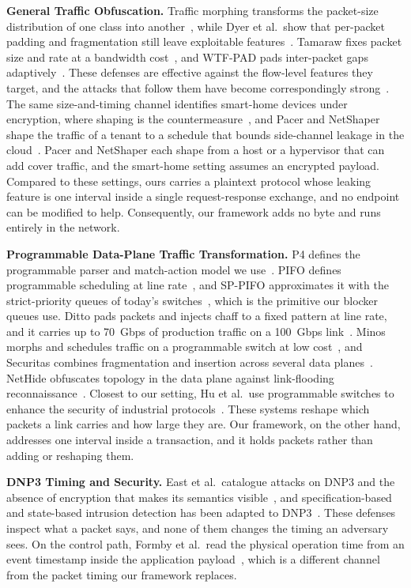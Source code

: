 \textbf{General Traffic Obfuscation.} Traffic morphing transforms the packet-size distribution of one
class into another~\cite{wright2009}, while Dyer et al.\ show that per-packet
padding and fragmentation still leave exploitable features~\cite{dyer2012}. Tamaraw
fixes packet size and rate at a bandwidth cost~\cite{tamaraw2014}, and
WTF-PAD pads inter-packet gaps adaptively~\cite{juarez2016}. These
defenses are effective against the flow-level features they target, and the attacks that follow them
have become correspondingly
strong~\cite{sirinam2018, panchenko2016}.
The same size-and-timing channel identifies smart-home devices under encryption, where shaping is the
countermeasure~\cite{apthorpe2019}, and Pacer and NetShaper shape the traffic of a
tenant to a schedule that bounds side-channel leakage in the
cloud~\cite{pacer2022, netshaper2024}. Pacer and
NetShaper each shape from a host or a hypervisor that can add cover traffic, and the smart-home
setting assumes an encrypted payload. Compared to these settings, ours carries a plaintext protocol
whose leaking feature is one interval inside a single request-response exchange, and no endpoint can
be modified to help. Consequently, our framework adds no byte and runs entirely in the network.

\textbf{Programmable Data-Plane Traffic Transformation.} P4 defines the programmable parser and
match-action model we use~\cite{p4ccr2014}. PIFO defines
programmable scheduling at line rate~\cite{pifo2016}, and SP-PIFO
approximates it with the strict-priority queues of today's
switches~\cite{sppifo2020}, which is the primitive our blocker queues use.
Ditto pads packets and injects chaff to a fixed pattern at line rate,
and it carries up to 70~Gbps of production traffic on a 100~Gbps
link~\cite{ditto2022}. Minos morphs and schedules traffic on a programmable switch at
low cost~\cite{minos2025}, and Securitas combines fragmentation and insertion
across several data planes~\cite{securitas2026}. NetHide obfuscates topology in
the data plane against link-flooding reconnaissance~\cite{nethide2018}. Closest
to our setting, Hu et al.\ use programmable switches to enhance the security of industrial
protocols~\cite{hulin2023}. These systems reshape which packets a link carries
and how large they are. Our framework, on the other hand, addresses one interval inside a
transaction, and it holds packets rather than adding or reshaping them.

\textbf{DNP3 Timing and Security.} East et al.\ catalogue attacks on DNP3 and the absence of
encryption that makes its semantics visible~\cite{east2009}, and
specification-based and state-based intrusion detection has been adapted to
DNP3~\cite{linbro2013, fovino2010}. These defenses inspect what a
packet says, and none of them changes the timing an adversary sees. On the control path, Formby et
al.\ read the physical operation time from an event timestamp inside the application
payload~\cite{formby2016}, which is a different channel from the packet timing our
framework replaces.

